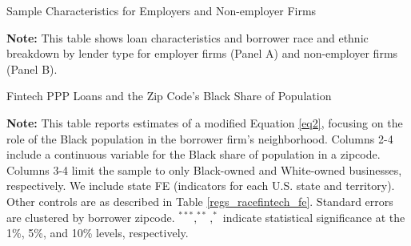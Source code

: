 \documentclass[11pt]{article}
\begin{document}
\newpage
\begin{table}[H]
	\caption{Sample Characteristics for Employers and Non-employer Firms} \label{t_stats_samples_emp}
	\begin{adjustbox}{width=\linewidth, center}
		
	\end{adjustbox}

	\begin{adjustbox}{width=\linewidth, center}
		
	\end{adjustbox}
	
	\begin{minipage}{\textwidth} \medskip
		\footnotesize{{\bf Note: }This table shows loan characteristics and borrower race and ethnic breakdown by lender type for employer firms (Panel A) and non-employer firms (Panel B).}
	\end{minipage}

\end{table}


\newpage
\begin{table}[H]
	\caption{Fintech PPP Loans and the Zip Code's Black Share of Population} \label{black_share_zip}
	\begin{center}
		
	\end{center}

	\begin{minipage}{\textwidth} \medskip
		\footnotesize{{\bf Note: }This table reports estimates of a modified Equation \ref{eq2}, focusing on the role of the Black population in the borrower firm's neighborhood. Columns 2-4 include a continuous variable for the Black share of population in a zipcode. Columns 3-4 limit the sample to only Black-owned and White-owned businesses, respectively. We include state FE (indicators for each U.S. state and territory). Other controls are as described in Table \ref{regs_racefintech_fe}. Standard errors are clustered by borrower zipcode. $^{***}, ^{**}, ^{*}$ indicate statistical significance at the 1\%, 5\%, and 10\% levels, respectively.}
	\end{minipage}
\end{table}
\end{document}
